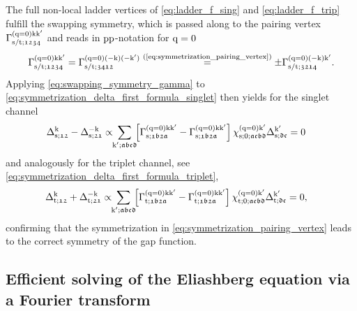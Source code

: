 \documentclass[\main/main.tex]{subfiles}
\begin{document}
The full non-local ladder vertices of \eqref{eq:ladder_f_sing} and \eqref{eq:ladder_f_trip} fulfill the swapping symmetry, which is passed along to the pairing vertex $\Gamma^{(\text{q}=0)\text{k}\text{k}'}_{\text{s}/\text{t};\mathfrak{1234}}$ and reads in $\text{pp}$-notation for $\text{q}=0$
\begin{align}\label{eq:swapping_symmetry_gamma}
	\Gamma^{(\text{q}=0)\text{k}\text{k}'}_{\text{s}/\text{t};\mathfrak{1234}}=\Gamma^{(\text{q}=0)(-\text{k})(-\text{k}')}_{\text{s}/\text{t};\mathfrak{3412}}\overset{\text{(\ref{eq:symmetrization_pairing_vertex})}}{=}\pm \Gamma^{(\text{q}=0)(-\text{k})\text{k}'}_{\text{s}/\text{t};\mathfrak{3214}}.
\end{align}
Applying \eqref{eq:swapping_symmetry_gamma} to \eqref{eq:symmetrization_delta_first_formula_singlet} then yields for the singlet channel
\begin{align}
	\Delta_{\text{s};\mathfrak{12}}^{\text{k}}-\Delta_{\text{s};\mathfrak{21}}^{-\text{k}}&\propto\!\!\sum_{\text{k}';\mathfrak{abcd}}\!\! \left [\Gamma^{(\text{q}=0)\text{k}\text{k}'}_{\text{s};\mathfrak{1b2a}}-\Gamma^{(\text{q}=0)\text{k}\text{k}'}_{\text{s};\mathfrak{1b2a}}\right ]\chi^{(\text{q}=0)\text{k}'}_{\text{s};0;\mathfrak{acbd}}\Delta_{\text{s};\mathfrak{dc}}^{\text{k}'}=0
\end{align}
and analogously for the triplet channel, see \eqref{eq:symmetrization_delta_first_formula_triplet},
\begin{align}
	\Delta_{\text{t};\mathfrak{12}}^{\text{k}}+\Delta_{\text{t};\mathfrak{21}}^{-\text{k}}&\propto\!\!\sum_{\text{k}';\mathfrak{abcd}}\!\! \left [\Gamma^{(\text{q}=0)\text{k}\text{k}'}_{\text{t};\mathfrak{1b2a}}-\Gamma^{(\text{q}=0)\text{k}\text{k}'}_{\text{t};\mathfrak{1b2a}}\right ]\chi^{(\text{q}=0)\text{k}'}_{\text{t};0;\mathfrak{acbd}}\Delta_{\text{t};\mathfrak{dc}}^{\text{k}'}=0,
\end{align}
confirming that the symmetrization in \eqref{eq:symmetrization_pairing_vertex} leads to the correct symmetry of the gap function.

\subsection{Efficient solving of the Eliashberg equation via a Fourier transform}
\end{document}
